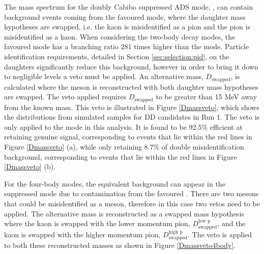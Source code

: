 The \Bm mass spectrum for the doubly Cabibo suppressed ADS mode, \pik, can contain background events coming from the favoured \kpi mode, where the \Dz daughter mass hypotheses are swapped, i.e. the kaon is misidentified as a pion and the pion is misidentified as a kaon. When considering the two-body \Dz decay modes, the favoured \kpi mode has a branching ratio 281 times higher than the \pik mode. Particle identification requirements, detailed in Section \ref{sec:selection:pid}, on the \Dz daughters significantly reduce this background, however in order to bring it down to negligible levels a veto must be applied. An alternative \Dz mass, $D_{\text{swapped}}$, is calculated where the \Dz meson is reconstructed with both daughter mass hypotheses are swapped. The veto applied requires $D_{\text{swapped}}$ to be greater than 15 MeV away from the known \Dz mass. This veto is illustrated in Figure \ref{Dmassveto}, which shows the distributions from simulated samples for DD candidates in Run 1. The veto is only applied to the \pik mode in this analysis. It is found to be 92.5\% efficient at retaining genuine signal, corresponding to events that lie within the red lines in Figure \ref{Dmassveto} (a), while only retaining 8.7\% of double misidentification background, corresponding to events that lie within the red lines in Figure \ref{Dmassveto} (b). 

For the four-body modes, the equivalent background can appear in the suppressed \pikpipi mode due to contamination from the favoured \kpipipi. There are two \pip mesons that could be misidentified as a \Kp meson, therefore in this case two vetos need to be applied. The alternative \Dz mass is reconstructed as a swapped mass hypothesis where the kaon is swapped with the lower momentum pion, $D_{\text{swapped}}^{\text{low p}}$, and the kaon is swapped with the higher momentum pion, $D_{\text{swapped}}^{\text{high p}}$. The veto is applied to both these reconstructed masses as shown in Figure \ref{Dmassveto4body}.

